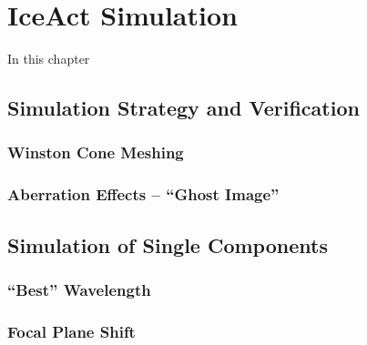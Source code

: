 \chapter{IceAct Simulation}\label{chap:iceact_sim}

In this chapter

\section{Simulation Strategy and Verification}

\subsection{Winston Cone Meshing}\label{sec:wico_meshing}

\subsection{Aberration Effects -- \enquote{Ghost Image}}

\section{Simulation of Single Components}

\subsection{\enquote{Best} Wavelength}

\subsection{Focal Plane Shift}